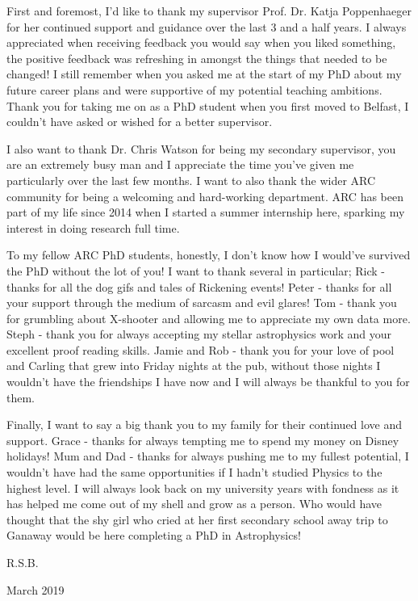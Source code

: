 \documentclass[
12pt, %
oneside, %
english, %
onehalfspacing, %
liststotoc, %
headsepline, %
]{MastersDoctoralThesis} %
\begin{document}
\begin{acknowledgements}
\addchaptertocentry{\acknowledgementname} %

First and foremost, I'd like to thank my supervisor Prof. Dr. Katja Poppenhaeger for her continued support and guidance over the last 3 and a half years. I always appreciated when receiving feedback you would say when you liked something, the positive feedback was refreshing in amongst the things that needed to be changed! I still remember when you asked me at the start of my PhD about my future career plans and were supportive of my potential teaching ambitions. Thank you for taking me on as a PhD student when you first moved to Belfast, I couldn't have asked or wished for a better supervisor.

I also want to thank Dr. Chris Watson for being my secondary supervisor, you are an extremely busy man and I appreciate the time you've given me particularly over the last few months. I want to also thank the wider ARC community for being a welcoming and hard-working department. ARC has been part of my life since 2014 when I started a summer internship here, sparking my interest in doing research full time.

To my fellow ARC PhD students, honestly, I don't know how I would've survived the PhD without the lot of you! I want to thank several in particular; Rick - thanks for all the dog gifs and tales of Rickening events! Peter - thanks for all your support through the medium of sarcasm and evil glares! Tom - thank you for grumbling about X-shooter and allowing me to appreciate my own data more. Steph - thank you for always accepting my stellar astrophysics work and your excellent proof reading skills. Jamie and Rob - thank you for your love of pool and Carling that grew into Friday nights at the pub, without those nights I wouldn't have the friendships I have now and I will always be thankful to you for them.

Finally, I want to say a big thank you to my family for their continued love and support. Grace - thanks for always tempting me to spend my money on Disney holidays! Mum and Dad - thanks for always pushing me to my fullest potential, I wouldn't have had the same opportunities if I hadn't studied Physics to the highest level. I will always look back on my university years with fondness as it has helped me come out of my shell and grow as a person. Who would have thought that the shy girl who cried at her first secondary school away trip to Ganaway would be here completing a PhD in Astrophysics!

\begin{flushright}
R.S.B.

March 2019
\end{flushright}

\end{acknowledgements}
\end{document}
